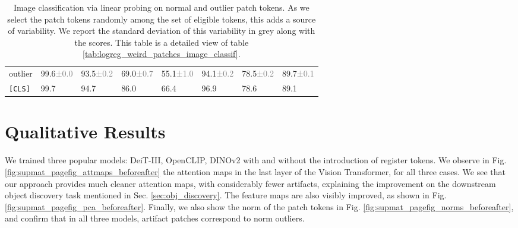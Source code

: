 \begin{table}[h]
\begin{tabular}{llllllll}
    outlier &  99.6\textcolor{gray}{\tiny{±0.0}} &  93.5\textcolor{gray}{\tiny{±0.2}} &  69.0\textcolor{gray}{\tiny{±0.7}} &  55.1\textcolor{gray}{\tiny{±1.0}} &  94.1\textcolor{gray}{\tiny{±0.2}} &  78.5\textcolor{gray}{\tiny{±0.2}} &  89.7\textcolor{gray}{\tiny{±0.1}} \\
    \texttt{[CLS]} &                               99.7 &                               94.7 &                               86.0 &                               66.4 &                               96.9 &                               78.6 &                               89.1 \\
    \bottomrule
    \end{tabular}
    \caption{Image classification via linear probing on normal and outlier patch tokens. As we select the patch tokens randomly among the set of eligible tokens, this adds a source of variability. We report the standard deviation of this variability in grey along with the scores. This table is a detailed view of table \ref{tab:logreg_weird_patches_image_classif}.}
    \label{tab:logreg_weird_patches_image_classif_with_std}
\end{table}


\section{Qualitative Results}
\label{sec:appendix_qualitative}
We trained three popular models: DeiT-III, OpenCLIP, DINOv2 with and without the introduction of register tokens.
We observe in Fig. \ref{fig:supmat_pagefig_attmaps_beforeafter} the attention maps in the last layer of the Vision Transformer, for all three cases.
We see that our approach provides much cleaner attention maps, with considerably fewer artifacts, explaining the improvement on the downstream object discovery task mentioned in Sec. \ref{sec:obj_discovery}.
The feature maps are also visibly improved, as shown in Fig. \ref{fig:supmat_pagefig_pca_beforeafter}.
Finally, we also show the norm of the patch tokens in Fig. \ref{fig:supmat_pagefig_norms_beforeafter}, and confirm that in all three models, artifact patches correspond to norm outliers.


\newpage












